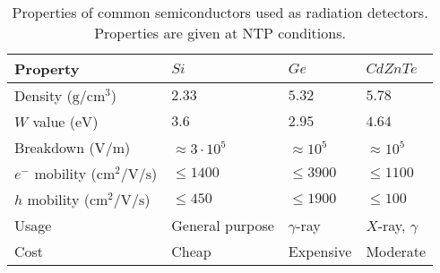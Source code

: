 \begin{table}[!ht]
	\centering
	\caption[Properties of common semiconductors used as radiation detectors.]{Properties of common semiconductors \cite{NSM2005,Eisen1996} used as radiation detectors. Properties are given at NTP conditions.}
	\label{chap3:semiconductor}
	\begin{tabularx}{\linewidth}{lXXX}
    \toprule
    Property & $Si$ & $Ge$ & $CdZnTe$ \\
    \midrule
    Density ($\mathrm{g/cm^3}$)& $2.33$  & $5.32$ & $5.78$ \\
    $W$ value ($\mathrm{eV}$) & $3.6$ & $2.95$ & $4.64$ \\
    Breakdown ($\mathrm{V/m}$) & $\approx 3\cdot10^5$ & $\approx 10^5$ & $\approx 10^5$\\
    $e^{-}$ mobility ($\mathrm{cm^{2}/V/s}$) & $\leq 1400$ & $\leq 3900$ & $\leq 1100$\\
    $h$ mobility ($\mathrm{cm^{2}/V/s}$) & $\leq 450$ & $\leq 1900$ & $\leq 100$ \\
    Usage & General purpose & $\gamma$-ray & $X$-ray, $\gamma$\\
    Cost & Cheap & Expensive & Moderate\\
		\bottomrule
	\end{tabularx}
\end{table}
